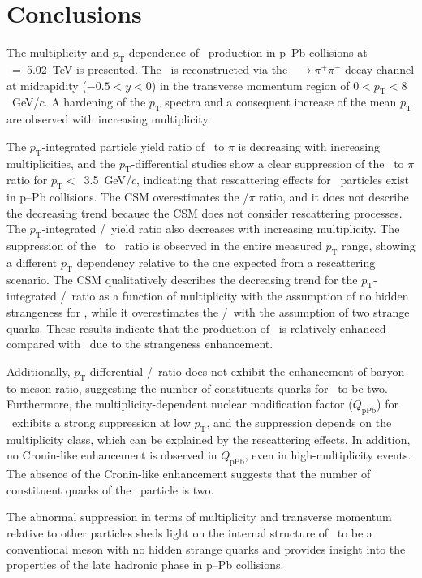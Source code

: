 
\section{Conclusions}
\label{sec:summary}

The multiplicity and $p_{\mathrm{T}}$ dependence of \fzero~production in p--Pb collisions at \snn~=~5.02~TeV is presented. The \fzero~is reconstructed via the \fzero~$\rightarrow\pi^{+}\pi^{-}$ decay channel at midrapidity ($-0.5<y<0$) in the transverse momentum region of $0<p_{\mathrm{T}}<8$~GeV/$c$. A hardening of the $p_{\mathrm{T}}$ spectra and a consequent increase of the mean $p_{\mathrm{T}}$ are observed with increasing multiplicity. 

The $p_{\mathrm{T}}$-integrated particle yield ratio of \fzero~to $\pi$ is decreasing with increasing multiplicities, and the $p_{\mathrm{T}}$-differential studies show a clear suppression of the \fzero~to $\pi$ ratio for $p_{\mathrm{T}}<$~3.5~GeV/$c$, indicating that rescattering effects for \fzero~particles exist in p--Pb collisions. The CSM overestimates the \fzero/$\pi$ ratio, and it does not describe the decreasing trend because the CSM does not consider rescattering processes. The $p_{\mathrm{T}}$-integrated \fzero/\kstar~yield ratio also decreases with increasing multiplicity. The suppression of the \fzero~to \kstar~ratio is observed in the entire measured $p_{\mathrm{T}}$ range, showing a different $p_{\mathrm{T}}$ dependency relative to the one expected from a rescattering scenario. The CSM qualitatively describes the decreasing trend for the $p_{\mathrm{T}}$-integrated \fzero/\kstar~ratio as a function of multiplicity with the assumption of no hidden strangeness for \fzero, while it overestimates the \fzero/\kstar~with the assumption of two strange quarks. These results indicate that the production of \kstar~is relatively enhanced compared with \fzero~due to the strangeness enhancement. 


Additionally, $p_{\mathrm{T}}$-differential \fzero/\kstar~ratio does not exhibit the enhancement of baryon-to-meson ratio, suggesting the number of constituents quarks for \fzero~to be two. Furthermore, the multiplicity-dependent nuclear modification factor ($Q_{\mbox{pPb}}$) for \fzero~exhibits a strong suppression at low $p_{\mathrm{T}}$, and the suppression depends on the multiplicity class, which can be explained by the rescattering effects. In addition, no Cronin-like enhancement is observed in $Q_{\mbox{pPb}}$, even in high-multiplicity events. The absence of the Cronin-like enhancement suggests that the number of constituent quarks of the \fzero~particle is two. 

The abnormal suppression in terms of multiplicity and transverse momentum relative to other particles sheds light on the internal structure of \fzero~to be a conventional meson with no hidden strange quarks and provides insight into the properties of the late hadronic phase in p--Pb collisions.
